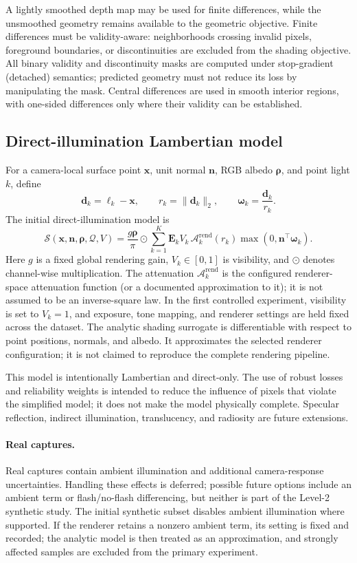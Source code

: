 \documentclass[11pt,a4paper]{article}
\newcommand{\Sshade}{\mathcal{S}}
\begin{document}
A lightly smoothed depth map may be used for finite differences, while
the unsmoothed geometry remains available to the geometric objective.
Finite differences must be validity-aware: neighborhoods
crossing invalid pixels, foreground boundaries, or discontinuities
are excluded from the shading objective. All binary validity and
discontinuity masks are computed under stop-gradient (detached) semantics;
predicted geometry must not reduce its loss by manipulating the mask. Central differences are used
in smooth interior regions, with one-sided differences only where their
validity can be established.

\subsection{Direct-illumination Lambertian model}
\label{sec:lambert}

For a camera-local surface point $\bm x$, unit normal $\bm n$, RGB albedo
$\bm\rho$, and point light $k$, define
\[
  \bm d_k=\bm\ell_k-\bm x,\qquad
  r_k=\|\bm d_k\|_2,\qquad
  \bm\omega_k=\frac{\bm d_k}{r_k}.
\]
The initial direct-illumination model is
\[
  \boxed{
  \Sshade(\bm x,\bm n,\bm\rho,\mathcal Q,V)
  =
  \frac{g\bm\rho}{\pi}
  \odot
  \sum_{k=1}^{K}
  \bm E_k V_k\,\mathcal A_k^{\mathrm{rend}}(r_k)
  \max(0,\bm n^\top\bm\omega_k).
  }
\]
Here $g$ is a fixed global rendering gain, $V_k\in[0,1]$ is visibility,
and $\odot$ denotes channel-wise multiplication. The attenuation
$\mathcal A_k^{\mathrm{rend}}$ is the configured renderer-space
attenuation function (or a documented approximation to it); it is not
assumed to be an inverse-square law. In the first controlled experiment,
visibility is set to $V_k=1$, and exposure, tone mapping, and renderer
settings are held fixed across the dataset.
The analytic shading surrogate is differentiable with respect to point
positions, normals, and albedo. It approximates the selected renderer
configuration; it is not claimed to reproduce the complete rendering
pipeline.

This model is intentionally Lambertian and direct-only. The use of
robust losses and reliability weights is intended to reduce the influence
of pixels that violate the simplified model; it does not make the model
physically complete. Specular reflection, indirect illumination,
translucency, and radiosity are future extensions.

\paragraph{Real captures.}
Real captures contain ambient illumination and additional camera-response
uncertainties. Handling these effects is deferred; possible future options
include an ambient term or flash/no-flash differencing, but neither is part
of the Level-2 synthetic study.
The initial synthetic subset disables ambient illumination where supported.
If the renderer retains a nonzero ambient term, its setting is fixed and
recorded; the analytic model is then treated as an approximation, and
strongly affected samples are excluded from the primary experiment.
\end{document}
